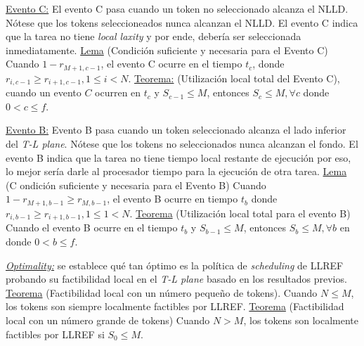 \underline{Evento C:} El evento C pasa cuando un token no seleccionado alcanza el NLLD. Nótese que los tokens seleccioneados nunca alcanzan el NLLD. El evento C indica que la tarea no tiene \emph{local laxity} y por ende, debería ser seleccionada inmediatamente. \underline{Lema} (Condición suficiente y necesaria para el Evento C) Cuando $1 - r_{M+1, c - 1}$, el evento C ocurre en el tiempo $t_c$, donde $r_{i, c-1} \geq r_{i+1, c-1}, 1 \leq i < N$. \underline{Teorema:} (Utilización local total del Evento C), cuando un evento $C$ ocurren en $t_c$ y $S_{c-1} \leq M$, entonces $S_c \leq M, \forall c$ donde $0 < c \leq f$. 

\underline{Evento B:} Evento B pasa cuando un token seleccionado alcanza el lado inferior del \emph{T-L plane}. Nótese que los tokens no seleccionados nunca alcanzan el fondo. El evento B indica que la tarea no tiene tiempo local restante de ejecución por eso, lo mejor sería darle al procesador tiempo para la ejecución de otra tarea. \underline{Lema} (C ondición suficiente y necesaria para el Evento B) Cuando $1 - r_{M+1,b-1} \geq r_{M, b-1}$, el evento B ocurre en tiempo $t_b$ donde $r_{i,b-1} \geq r_{i+1, b-1}, 1 \leq 1 < N$. \underline{Teorema} (Utilización local total para el evento B) Cuando el evento B ocurre en el tiempo $t_b$ y $S_{b-1} \leq M$, entonces $S_b \leq M, \forall b$ en donde $0 < b \leq f$. 

\underline{\emph{Optimality:}} se establece qué tan óptimo es la política de \emph{scheduling} de LLREF probando su factibilidad local en el \emph{T-L plane} basado en los resultados previos. \underline{Teorema} (Factibilidad local con un número pequeño de tokens). Cuando $N \leq M$, los tokens son siempre localmente factibles por LLREF. \underline{Teorema} (Factibilidad local con un número grande de tokens) Cuando $N > M$, los tokens son localmente factibles por LLREF si $S_0 \leq M$. 

